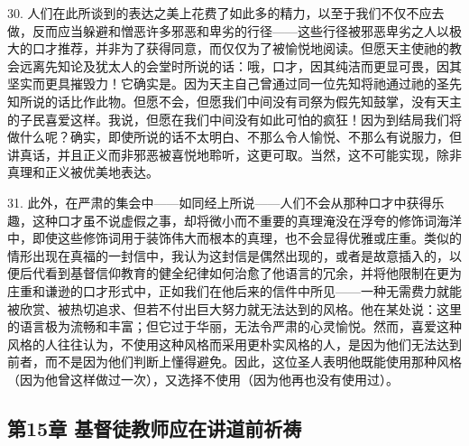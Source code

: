 30. 人们在此所谈到的表达之美上花费了如此多的精力，以至于我们不仅不应去做，反而应当躲避和憎恶许多邪恶和卑劣的行径——这些行径被邪恶卑劣之人以极大的口才推荐，并非为了获得同意，而仅仅为了被愉悦地阅读。但愿天主使祂的教会远离先知论及犹太人的会堂时所说的话：哦，口才，因其纯洁而更显可畏，因其坚实而更具摧毁力！它确实是。因为天主自己曾通过同一位先知将祂通过祂的圣先知所说的话比作此物。但愿不会，但愿我们中间没有司祭为假先知鼓掌，没有天主的子民喜爱这样。我说，但愿在我们中间没有如此可怕的疯狂！因为到结局我们将做什么呢？确实，即使所说的话不太明白、不那么令人愉悦、不那么有说服力，但讲真话，并且正义而非邪恶被喜悦地聆听，这更可取。当然，这不可能实现，除非真理和正义被优美地表达。\par

31. 此外，在严肃的集会中——如同经上所说——人们不会从那种口才中获得乐趣，这种口才虽不说虚假之事，却将微小而不重要的真理淹没在浮夸的修饰词海洋中，即使这些修饰词用于装饰伟大而根本的真理，也不会显得优雅或庄重。类似的情形出现在真福的一封信中，我认为这封信是偶然出现的，或者是故意插入的，以便后代看到基督信仰教育的健全纪律如何治愈了他语言的冗余，并将他限制在更为庄重和谦逊的口才形式中，正如我们在他后来的信件中所见——一种无需费力就能被欣赏、被热切追求、但若不付出巨大努力就无法达到的风格。他在某处说：这里的语言极为流畅和丰富；但它过于华丽，无法令严肃的心灵愉悦。然而，喜爱这种风格的人往往认为，不使用这种风格而采用更朴实风格的人，是因为他们无法达到前者，而不是因为他们判断上懂得避免。因此，这位圣人表明他既能使用那种风格（因为他曾这样做过一次），又选择不使用（因为他再也没有使用过）。\par


\subsection{第15章 基督徒教师应在讲道前祈祷}

